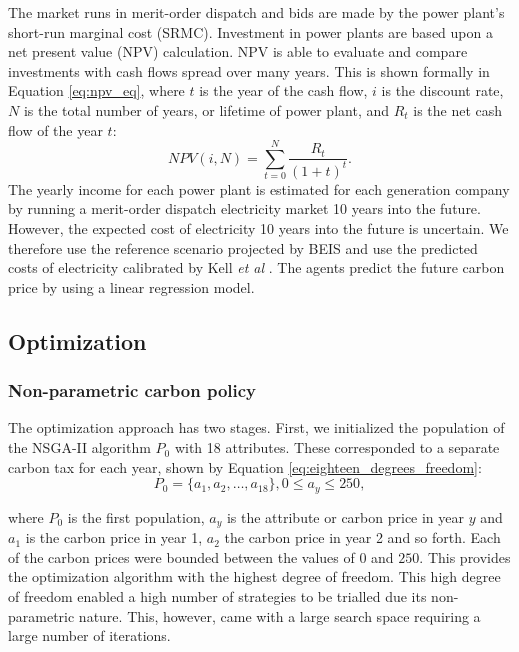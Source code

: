 \documentclass[sigconf]{acmart}
\begin{document}
The market runs in merit-order dispatch and bids are made by the power plant's short-run marginal cost (SRMC). Investment in power plants are based upon a net present value (NPV) calculation. NPV is able to evaluate and compare investments with cash flows spread over many years. This is shown formally in Equation \ref{eq:npv_eq}, where $t$ is the year of the cash flow, $i$ is the discount rate, $N$ is the total number of years, or lifetime of power plant, and $R_t$ is the net cash flow of the year $t$:
\begin{equation} \label{eq:npv_eq}
NPV(i, N) = \sum_{t=0}^{N}\frac{R_t}{(1+t)^t}.
\end{equation}
The yearly income for each power plant is estimated for each generation company by running a merit-order dispatch electricity market 10 years into the future. However, the expected cost of electricity 10 years into the future is uncertain. We therefore use the reference scenario projected by BEIS and use the predicted costs of electricity calibrated by Kell \textit{et al} \cite{DBEIS2019, Kell2020}. The agents predict the future carbon price by using a linear regression model.


\subsection{Optimization}
\label{ssec:optimization}
\subsubsection{Non-parametric carbon policy}
\label{sssec:non_parametric_strategy}
The optimization approach has two stages. First, we initialized the population of the NSGA-II algorithm $P_0$ with 18 attributes. These corresponded to a separate carbon tax for each year, shown by Equation \ref{eq:eighteen_degrees_freedom}:
\begin{equation}
\label{eq:eighteen_degrees_freedom}
	P_0=\{a_1,a_2,\ldots,a_{18}\}, 0\leq a_y\leq 250,
\end{equation} 

\noindent where $P_0$ is the first population, $a_y$ is the attribute or carbon price in year $y$ and $a_1$ is the carbon price in year 1, $a_2$ the carbon price in year 2 and so forth. Each of the carbon prices were bounded between the values of \textsterling$0$ and  \textsterling$250$. This provides the optimization algorithm with the highest degree of freedom. This high degree of freedom enabled a high number of strategies to be trialled due its non-parametric nature. This, however, came with a large search space requiring a large number of iterations.
\end{document}
